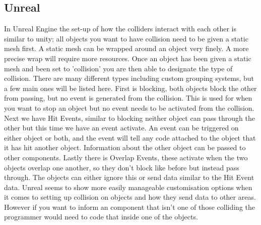 \documentclass{scrartcl}
\begin{document}
	\subsection{Unreal}
	In Unreal Engine the set-up of how the colliders interact with each other is similar to unity; all objects you want to have collision need to be given a static mesh first. A static mesh can be wrapped around an object very finely. A more precise wrap will require more resources\cite{staticmeshes_2018}. Once an object has been given a static mesh and been set to 'collision' you are then able to designate the type of collision. There are many different types including custom grouping systems, but a few main ones will be listed here\cite{collisionfilteringinunrealengine4_2018}. First is blocking, both objects block the other from passing, but no event is generated from the collision. This is used for when you want to stop an object but no event needs to be activated from the collision. Next we have Hit Events, similar to blocking neither object can pass through the other but this time we have an event activate. An event can be triggered on either object or both, and the event will tell any code attached to the object that it has hit another object. Information about the other object can be passed to other components. Lastly there is Overlap Events, these activate when the two objects overlap one another, so they don't block like before but instead pass through. The objects can either ignore this or send data similar to the Hit Event data\cite{UnrealCollision}. Unreal seems to show more easily manageable customisation options when it comes to setting up collision on objects and how they send data to other areas. However if you want to inform an component that isn't one of those colliding the programmer would need to code that inside one of the objects.
	
\end{document}
